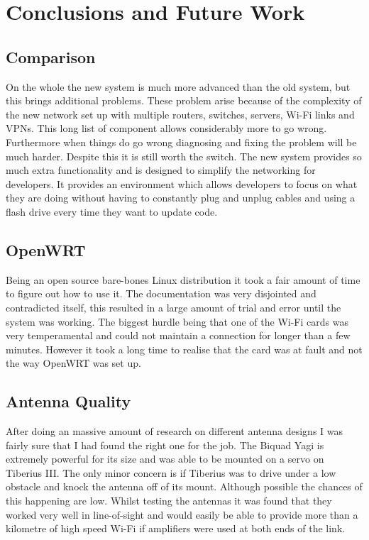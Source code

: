 \section{Conclusions and Future Work}
\subsection{Comparison}
On the whole the new system is much more advanced than the old system, but this brings additional problems. These problem arise because of the complexity of the new network set up with multiple routers, switches, servers, Wi-Fi links and VPNs. This long list of component allows considerably more to go wrong. Furthermore when things do go wrong diagnosing and fixing the problem will be much harder.
Despite this it is still worth the switch. The new system provides so much extra functionality and is designed to simplify the networking for developers. It provides an environment which allows developers to focus on what they are doing without having to constantly plug and unplug cables and using a flash drive every time they want to update code. 

\subsection{OpenWRT}
Being an open source bare-bones Linux distribution it took a fair amount of time to figure out how to use it. The documentation was very disjointed and contradicted itself, this resulted in a large amount of trial and error until the system was working. The biggest hurdle being that one of the Wi-Fi cards was very temperamental and could not maintain a connection for longer than a few minutes. However it took a long time to realise that the card was at fault and not the way OpenWRT was set up.

\subsection{Antenna Quality}
After doing an massive amount of research on different antenna designs I was fairly sure that I had found the right one for the job. The Biquad Yagi is extremely powerful for its size and was able to be mounted on a servo on Tiberius III. The only minor concern is if Tiberius was to drive under a low obstacle and knock the antenna off of its mount. Although possible the chances of this happening are low. 
\newline
Whilst testing the antennas it was found that they worked very well in line-of-sight and would easily be able to provide more than a kilometre of high speed Wi-Fi if amplifiers were used at both ends of the link.

